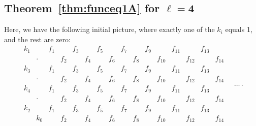 \documentclass[pdftex]{sigma}
\numberwithin{equation}{section}
\theoremstyle{definition}
\begin{document}
\subsection[Theorem~\ref{thm:funceq1A} for l=4]{Theorem~\ref{thm:funceq1A} for $\boldsymbol{\ell=4}$}\label{subsec:combspec}

Here, we have the following initial picture, where exactly one of the $k_i$ equals 1, and the rest are zero:
\begin{equation*}
\begin{matrix}
k_1 && f_1 && f_3 && f_5 && f_7 && f_9 && f_{11} && f_{13} & \\
& \cdot && f_2 && f_4 && f_6 && f_8 && f_{10} && f_{12} && f_{14} \\
k_3 && f_1 && f_3 && f_5 && f_7 && f_9 && f_{11} && f_{13} & \\
& \cdot && f_2 && f_4 && f_6 && f_8 && f_{10} && f_{12} && f_{14} \\
k_4 && f_1 && f_3 && f_5 && f_7 && f_9 && f_{11} && f_{13} & \\
& \cdot && f_2 && f_4 && f_6 && f_8 && f_{10} && f_{12} && f_{14} \\
k_2 && f_1 && f_3 && f_5 && f_7 && f_9 && f_{11} && f_{13} & \\
& k_0 && f_2 && f_4 && f_6 && f_8 && f_{10} && f_{12} && f_{14}
 \end{matrix}\quad\dots\,.
\end{equation*}
\end{document}
